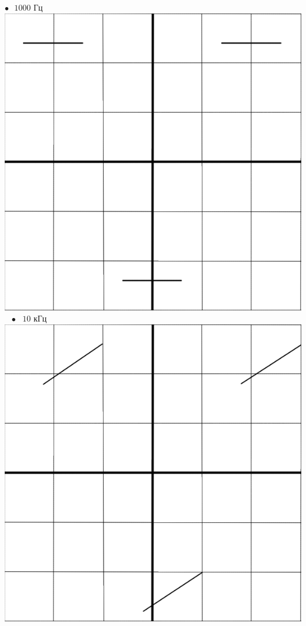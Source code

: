 \documentclass[a4paper,12pt]{article} %
\begin{document}
$\bullet\text{ } 1000\text{ Гц}\text{ }\text{ }\text{ }\text{ }$
\includegraphics[scale=0.28]{1000}
$\text{   }\bullet\text{ } 10\text{ кГц}$
\includegraphics[scale=0.28]{10000}\\\\
\end{document}
